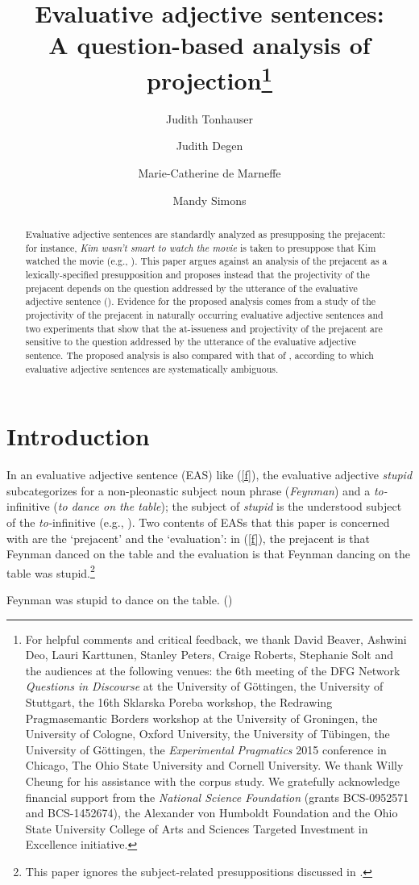 \documentclass[11pt,fleqn]{article}
\title{Evaluative adjective sentences: \\ A question-based analysis of projection\thanks{For helpful comments and critical feedback, we thank David Beaver, Ashwini Deo, Lauri Karttunen, Stanley Peters, Craige Roberts,
Stephanie Solt and the audiences at the following venues: the 6th meeting of the DFG Network
{\em Questions in Discourse} at the University of G\"ottingen, 
the University of Stuttgart, the 16th Sklarska Poreba workshop, the
Redrawing Pragmasemantic Borders workshop at the University of
Groningen, the University of Cologne, Oxford University, the University of T\"ubingen,  the University of G\"ottingen, the {\em
Experimental Pragmatics} 2015 conference in Chicago, The Ohio State
University and Cornell University. We thank Willy Cheung for his assistance with the corpus study. We gratefully acknowledge
financial support from the {\em National Science Foundation} (grants
BCS-0952571 and BCS-1452674), the Alexander von Humboldt Foundation and the Ohio State
University College of Arts and Sciences Targeted Investment in
Excellence initiative.}}
\author[$\circ$]{Judith Tonhauser}
\author[$\bullet$]{Judith Degen}
\author[$\circ$]{Marie-Catherine de Marneffe}
\author[$\star$]{Mandy Simons}
\affil[$\circ$]{The Ohio State University}
\affil[$\bullet$]{Stanford University}
\affil[$\star$]{Carnegie Mellon University}
\newcommand{\6}{\mbox{$[\hspace*{-.6mm}[$}}
\newcommand{\9}{\mbox{$]\hspace*{-.6mm}]$}}
\begin{document}

\maketitle

\begin{abstract}



Evaluative adjective sentences are standardly analyzed as presupposing the prejacent: for instance, {\em Kim wasn't smart to
watch the movie} is taken to presuppose that Kim watched the movie
(e.g., \citealt{norrick78,barker02,oshima09b,kertz2010}). This paper argues against an analysis of the prejacent as a lexically-specified presupposition and proposes instead that the projectivity of the prejacent depends on the question addressed by the utterance of the evaluative adjective sentence (\citealt{beaver-clark08,best-question,brst-ar}). Evidence for the proposed analysis comes from a study of the projectivity of the prejacent in naturally occurring evaluative adjective sentences and two experiments that show that the at-issueness and projectivity of the prejacent are sensitive to the question addressed by the utterance of the evaluative adjective sentence. The proposed analysis is also compared with that of \citealt{karttunen-etal2014}, according to which evaluative adjective sentences are systematically ambiguous. 


\end{abstract}


\section{Introduction}\label{s1}

In an evaluative adjective sentence (EAS) like (\ref{f}), the
evaluative adjective {\em stupid} subcategorizes for a non-pleonastic subject noun
phrase ({\em Feynman}) and a {\em to-}infinitive ({\em to
dance on the table}); the subject of {\em stupid} is the understood subject of the {\em to-}infinitive (e.g., \citealt{wilkinson70, norrick78,barker02,kertz2010}). Two contents of EASs that this paper is concerned with are the `prejacent' and the `evaluation': in (\ref{f}), the prejacent is that Feynman danced on the table and the evaluation is that 
Feynman dancing on the table was stupid.\footnote{This paper ignores the subject-related presuppositions discussed in \citealt{barker02}.}

\begin{exe} \ex\label{f} Feynman was stupid to dance on the table. \hfill (\citealt[18]{barker02})

\end{exe} 
\end{document}
